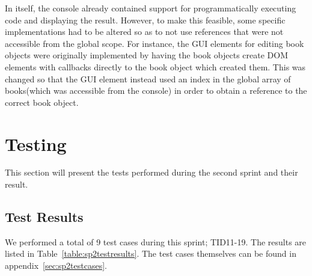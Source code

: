 In itself, the console already contained support for programmatically executing code and displaying the result. However, to make this feasible, some specific implementations had to be altered so as to not use references that were not accessible from the global scope. For instance, the GUI elements for editing book objects were originally implemented by having the book objects create DOM elements with callbacks directly to the book object which created them. This was changed so that the GUI element instead used an index in the global array of books(which was accessible from the console) in order to obtain a reference to the correct book object.

\section{Testing}
This section will present the tests performed during the second sprint and their result.

\subsection{Test Results}
We performed a total of 9 test cases during this sprint; TID11-19. The results are listed in Table~\ref{table:sp2testresults}. The test cases themselves can be found in appendix~\ref{sec:sp2testcases}.

